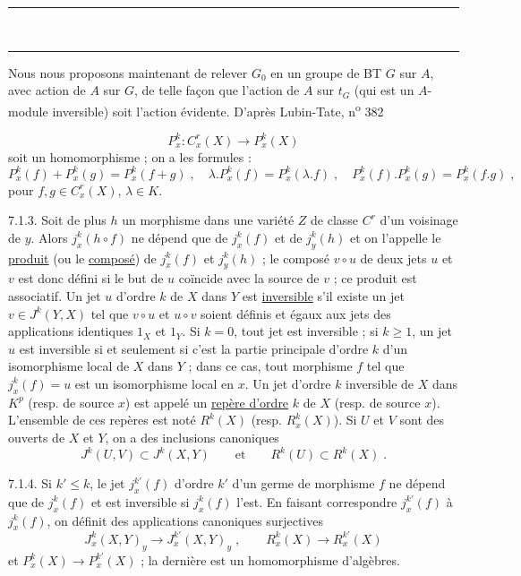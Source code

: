 \begin{center}\rule{2.2em}{0.3pt}\\[-4pt]\rule{1.2em}{0.3pt}\end{center}

Nous nous proposons maintenant de relever $G_0$  en un groupe de BT $G$ sur $A$,  avec action de $A$ sur $G$, de telle façon que l'action de $A$ sur $t_G$ (qui est un $A$-module inversible) soit l'action évidente. D'après Lubin-Tate,
\hfill n\textsuperscript{o} 382

\[
P^k_x:C^r_x(X)\longrightarrow P^k_x(X)
\]
soit un homomorphisme ; on a les formules :
\[
P^k_x(f)+P^k_x(g)=P^k_x(f+g)\;,\quad\lambda.P^k_x(f)=P^k_x(\lambda.f)\;,\quad P^k_x(f).P^k_x(g)=P^k_x(f.g)\;,
\]
pour $f,g\in C^r_x(X)$, $\lambda\in K$.

7.1.3. Soit de plus $h$ un morphisme dans une variété $Z$ de classe $C^r$ d'un voisinage de $y$. Alors $j^k_x(h\circ f)$ ne dépend que de $j^k_x(f)$ et de $j^k_y(h)$ et on l'appelle le \uline{produit} (ou le \uline{composé}) de $j^k_x(f)$ et $j^k_y(h)$ ; le composé $v\circ u$ de deux jets $u$ et $v$ est donc défini si le but de $u$ coïncide avec la source de $v$ ; ce produit est associatif. Un jet $u$ d'ordre $k$ de $X$ dans $Y$ est \uline{inversible} s'il existe un jet $v\in J^k(Y,X)$ tel que $v\circ u$ et $u\circ v$ soient définis et égaux aux jets des applications identiques $1_X$ et $1_Y$. Si $k=0$, tout jet est inversible ; si $k\geq 1$, un jet $u$ est inversible si et seulement si c'est la partie principale d'ordre $k$ d'un isomorphisme local de $X$ dans $Y$ ; dans ce cas, tout morphisme $f$ tel que $j^k_x(f)=u$ est un isomorphisme local en $x$. Un jet d'ordre $k$ inversible de $X$ dans $K^p$ (resp. de source $x$) est appelé un \uline{repère d'ordre} $k$ de $X$ (resp. de source $x$). L'ensemble de ces repères est noté $R^k(X)$ (resp. $R^k_x(X)$). Si $U$ et $V$ sont des ouverts de $X$ et $Y$, on a des inclusions canoniques
\[
J^k(U,V)\subset J^k(X,Y)\qquad\text{et}\qquad R^k(U)\subset R^k(X)\;.
\]

7.1.4. Si $k'\leq k$, le jet $j^{k'}_x(f)$ d'ordre $k'$ d'un germe de morphisme $f$ ne dépend que de $j^k_x(f)$ et est inversible si $j^k_x(f)$ l'est. En faisant correspondre $j^{k'}_x(f)$ à $j^k_x(f)$, on définit des applications canoniques surjectives
\[
J^k_x(X,Y)_y\longrightarrow J^{k'}_x(X,Y)_y\;,\qquad R^k_x(X)\longrightarrow R^{k'}_x(X)
\]
et $P^k_x(X)\longrightarrow P^{k'}_x(X)$ ; la dernière est un homomorphisme d'algèbres.

